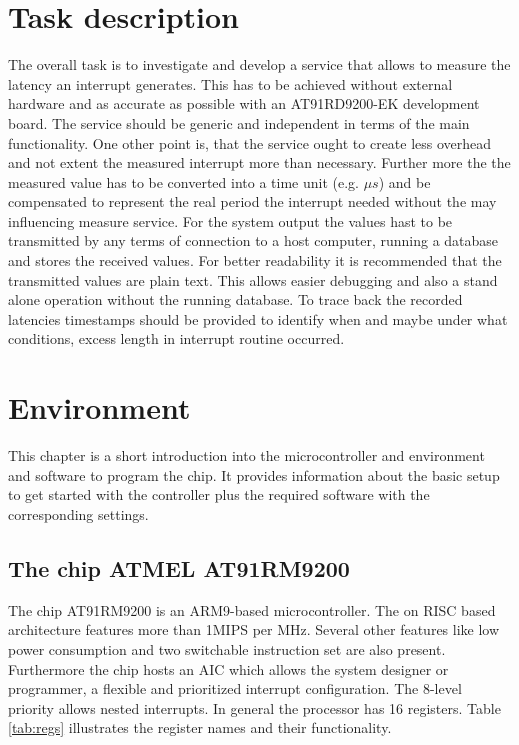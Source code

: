 \chapter{Task description}The overall task is to investigate and develop a service that allows to measure the latency an interrupt generates. This has to be achieved without external hardware and as accurate as possible with an AT91RD9200-EK development board. The service should be generic and independent in terms of the main functionality. One other point is, that the service ought to create less overhead and not extent the measured interrupt more than necessary. Further more the the measured value has to be converted into a time unit (e.g. $\mu s$) and be compensated to represent the real period the interrupt needed without the may influencing measure service. For the system output the values hast to be transmitted by any terms of connection to a host computer, running a database and stores the received values. For better readability it is recommended that the transmitted values are plain text. This allows easier debugging and also a stand alone operation without the running database. To trace back the recorded latencies timestamps should be provided to identify when and maybe under what conditions, excess length in interrupt routine occurred.\\


\chapter{Environment}
This chapter is a short introduction into the microcontroller and environment and software to program the chip. It provides information about the basic setup to get started with the controller plus the required software with the corresponding settings.\\

\section{The chip ATMEL AT91RM9200}
\label{atcore}
The chip AT91RM9200 is an ARM9-based microcontroller. The on \ac{RISC} based architecture features more than 1\ac{MIPS} per MHz. Several other features like low power consumption and two switchable instruction set are also present. Furthermore the chip hosts an \ac{AIC} which allows the system designer or programmer, a flexible and prioritized interrupt configuration. The 8-level priority allows nested interrupts. In general the processor has 16 registers. Table \ref{tab:regs} illustrates the register names and their functionality.

